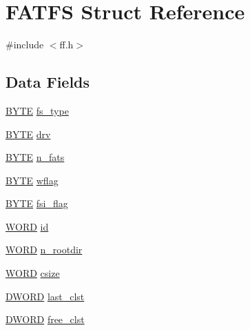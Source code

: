 \hypertarget{struct_f_a_t_f_s}{}\section{F\+A\+T\+FS Struct Reference}
\label{struct_f_a_t_f_s}


{\ttfamily \#include $<$ff.\+h$>$}

\subsection*{Data Fields}
\begin{DoxyCompactItemize}
\item 
\mbox{\hyperlink{lz4_8c_a4ae1dab0fb4b072a66584546209e7d58}{B\+Y\+TE}} \mbox{\hyperlink{struct_f_a_t_f_s_add27d97babe807b573eac98a71dc4ae5}{fs\+\_\+type}}
\item 
\mbox{\hyperlink{lz4_8c_a4ae1dab0fb4b072a66584546209e7d58}{B\+Y\+TE}} \mbox{\hyperlink{struct_f_a_t_f_s_a6a791560e2687e8b1569bfce61208d2d}{drv}}
\item 
\mbox{\hyperlink{lz4_8c_a4ae1dab0fb4b072a66584546209e7d58}{B\+Y\+TE}} \mbox{\hyperlink{struct_f_a_t_f_s_a56716c7e7ac10cf46e73ffb2a2e9b545}{n\+\_\+fats}}
\item 
\mbox{\hyperlink{lz4_8c_a4ae1dab0fb4b072a66584546209e7d58}{B\+Y\+TE}} \mbox{\hyperlink{struct_f_a_t_f_s_a647e43c9ccae94b7274793d1909897de}{wflag}}
\item 
\mbox{\hyperlink{lz4_8c_a4ae1dab0fb4b072a66584546209e7d58}{B\+Y\+TE}} \mbox{\hyperlink{struct_f_a_t_f_s_a84e9cdc5a6a8e33ea7ec192058abf161}{fsi\+\_\+flag}}
\item 
\mbox{\hyperlink{integer_8h_a197942eefa7db30960ae396d68339b97}{W\+O\+RD}} \mbox{\hyperlink{struct_f_a_t_f_s_a417095d7c20d56d417dc0998e0dd5a5c}{id}}
\item 
\mbox{\hyperlink{integer_8h_a197942eefa7db30960ae396d68339b97}{W\+O\+RD}} \mbox{\hyperlink{struct_f_a_t_f_s_a189a00aa038044ffad0fc7f7dcf2aae1}{n\+\_\+rootdir}}
\item 
\mbox{\hyperlink{integer_8h_a197942eefa7db30960ae396d68339b97}{W\+O\+RD}} \mbox{\hyperlink{struct_f_a_t_f_s_ad7fa7a509f8d097a9ab182d6c47be568}{csize}}
\item 
\mbox{\hyperlink{integer_8h_ad342ac907eb044443153a22f964bf0af}{D\+W\+O\+RD}} \mbox{\hyperlink{struct_f_a_t_f_s_ac26e848817569fedc15a9a4e49ddedd1}{last\+\_\+clst}}
\item 
\mbox{\hyperlink{integer_8h_ad342ac907eb044443153a22f964bf0af}{D\+W\+O\+RD}} \mbox{\hyperlink{struct_f_a_t_f_s_ac834248773bf338df807f0d7e6b6a579}{free\+\_\+clst}}

\end{DoxyCompactItemize}
